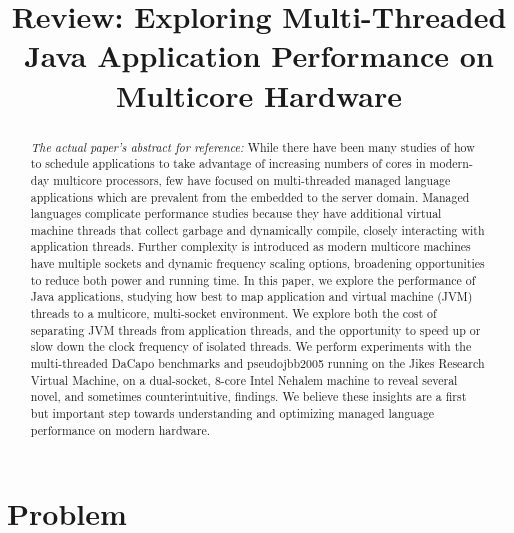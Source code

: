 \documentclass[conference]{IEEEtran}
\begin{document}
\title{Review: Exploring Multi-Threaded Java Application Performance on Multicore Hardware}

\author{
}

\maketitle

\begin{abstract}
\textit{The actual paper's abstract for reference:} While there have been many studies of how to schedule applications to take advantage of increasing numbers of cores
in modern-day multicore processors, few have focused on
multi-threaded managed language applications which are
prevalent from the embedded to the server domain. Managed
languages complicate performance studies because they
have additional virtual machine threads that collect garbage
and dynamically compile, closely interacting with application threads. Further complexity is introduced as modern
multicore machines have multiple sockets and dynamic frequency scaling options, broadening opportunities to reduce
both power and running time.
In this paper, we explore the performance of Java applications, studying how best to map application and virtual machine (JVM) threads to a multicore, multi-socket environment. We explore both the cost of separating JVM threads
from application threads, and the opportunity to speed up or
slow down the clock frequency of isolated threads. We perform experiments with the multi-threaded DaCapo benchmarks and pseudojbb2005 running on the Jikes Research
Virtual Machine, on a dual-socket, 8-core Intel Nehalem
machine to reveal several novel, and sometimes counterintuitive, ﬁndings. We believe these insights are a ﬁrst but
important step towards understanding and optimizing managed language performance on modern hardware.
\end{abstract}

\section{Problem}
\label{sec:problem}
\end{document}
